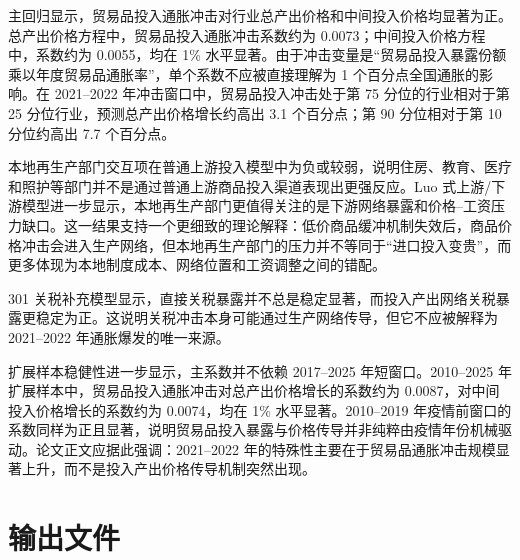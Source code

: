 \documentclass[12pt,a4paper,fontset=none]{ctexart}
\begin{document}
主回归显示，贸易品投入通胀冲击对行业总产出价格和中间投入价格均显著为正。总产出价格方程中，贸易品投入通胀冲击系数约为 0.0073；中间投入价格方程中，系数约为 0.0055，均在 1\% 水平显著。由于冲击变量是“贸易品投入暴露份额乘以年度贸易品通胀率”，单个系数不应被直接理解为 1 个百分点全国通胀的影响。在 2021--2022 年冲击窗口中，贸易品投入冲击处于第 75 分位的行业相对于第 25 分位行业，预测总产出价格增长约高出 3.1 个百分点；第 90 分位相对于第 10 分位约高出 7.7 个百分点。

本地再生产部门交互项在普通上游投入模型中为负或较弱，说明住房、教育、医疗和照护等部门并不是通过普通上游商品投入渠道表现出更强反应。Luo 式上游/下游模型进一步显示，本地再生产部门更值得关注的是下游网络暴露和价格--工资压力缺口。这一结果支持一个更细致的理论解释：低价商品缓冲机制失效后，商品价格冲击会进入生产网络，但本地再生产部门的压力并不等同于“进口投入变贵”，而更多体现为本地制度成本、网络位置和工资调整之间的错配。

301 关税补充模型显示，直接关税暴露并不总是稳定显著，而投入产出网络关税暴露更稳定为正。这说明关税冲击本身可能通过生产网络传导，但它不应被解释为 2021--2022 年通胀爆发的唯一来源。

扩展样本稳健性进一步显示，主系数并不依赖 2017--2025 年短窗口。2010--2025 年扩展样本中，贸易品投入通胀冲击对总产出价格增长的系数约为 0.0087，对中间投入价格增长的系数约为 0.0074，均在 1\% 水平显著。2010--2019 年疫情前窗口的系数同样为正且显著，说明贸易品投入暴露与价格传导并非纯粹由疫情年份机械驱动。论文正文应据此强调：2021--2022 年的特殊性主要在于贸易品通胀冲击规模显著上升，而不是投入产出价格传导机制突然出现。

\section{输出文件}
\end{document}
